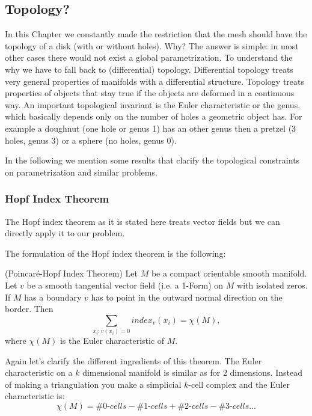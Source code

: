\subsection{Topology?}
In this Chapter we constantly made the restriction that the mesh should have the topology of a disk (with or without holes). Why? The answer is simple: in most other cases there would not exist a global parametrization. To understand the why we have to fall back to (differential) topology. Differential topology treats very general properties of manifolds with a differential structure. Topology treats properties of objects that stay true if the objects are deformed in a continuous way. An important topological invariant is the Euler characteristic or the genus, which basically depends only on the number of holes a geometric object has. For example a doughnut (one hole or genus 1) has an other genus then a pretzel (3 holes, genus 3) or a sphere (no holes, genus 0).

In the following we mention some results that clarify the topological constraints on parametrization and similar problems.

\subsubsection{Hopf Index Theorem}
The Hopf index theorem  as it is stated here treats vector fields but we can directly apply it to our problem.

The formulation of the Hopf index theorem is the following:
\begin{thm}(Poincar\'e-Hopf Index Theorem) Let $M$ be a compact orientable smooth manifold. Let $v$ be a smooth tangential vector field (i.e. a 1-Form) on $M$ with isolated zeros. If $M$ has a boundary $v$ has to point in the outward normal direction on the border.  Then
\[\sum_{x_i: v(x_i) = 0} index_v(x_i) = \chi(M),\]
where $\chi(M)$ is the Euler characteristic of $M$.
\end{thm}
Again let's clarify the different ingredients of this theorem. The Euler characteristic on a $k$ dimensional manifold is similar as for 2 dimensions. Instead of making a triangulation you make a simplicial $k$-cell complex and the Euler characteristic is:
\[\chi(M) = \# \textit{0-cells} - \# \textit{1-cells} + \# \textit{2-cells} - \# \textit{3-cells} ...\]


